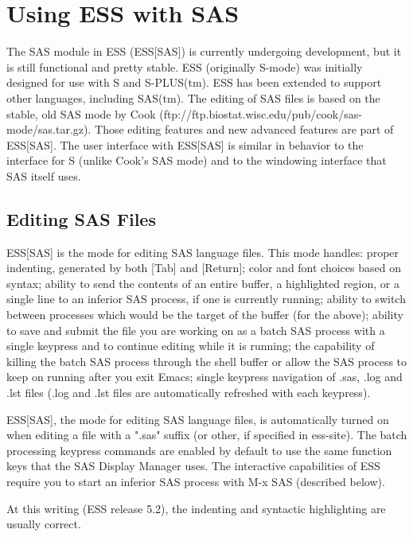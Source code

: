 \documentclass{article}
\begin{document}
\section{Using ESS with SAS}
\label{sec:SAS}

The SAS module in ESS (ESS[SAS]) is currently undergoing development,
but it is still functional and pretty stable.  ESS (originally S-mode)
was initially designed for use with S and S-PLUS(tm).  ESS has been
extended to support other languages, including SAS(tm).  The editing
of SAS files is based on the stable, old SAS mode by Cook
(ftp://ftp.biostat.wisc.edu/pub/cook/sas-mode/sas.tar.gz).  Those
editing features and new advanced features are part of ESS[SAS].  The
user interface with ESS[SAS] is similar in behavior to the interface
for S (unlike Cook's SAS mode) and to the windowing interface that SAS
itself uses.

\subsection{Editing SAS Files}
\label{sec:SAS:edit}

ESS[SAS] is the mode for editing SAS language files.  This mode
handles: proper indenting, generated by both [Tab] and [Return]; color
and font choices based on syntax; ability to send the contents of an
entire buffer, a highlighted region, or a single line to an inferior
SAS process, if one is currently running; ability to switch between
processes which would be the target of the buffer (for the above);
ability to save and submit the file you are working on as a batch SAS
process with a single keypress and to continue editing while it is
running; the capability of killing the batch SAS process through the
shell buffer or allow the SAS process to keep on running after you
exit Emacs; single keypress navigation of .sas, .log and .lst files
(.log and .lst files are automatically refreshed with each keypress).

ESS[SAS], the mode for editing SAS language files, is automatically
turned on when editing a file with a ".sas" suffix (or other, if
specified in ess-site).  The batch processing keypress commands are
enabled by default to use the same function keys that the SAS Display
Manager uses.  The interactive capabilities of ESS require you to
start an inferior SAS process with M-x SAS (described below).

At this writing (ESS release 5.2), the indenting and syntactic
highlighting are usually correct.
\end{document}
